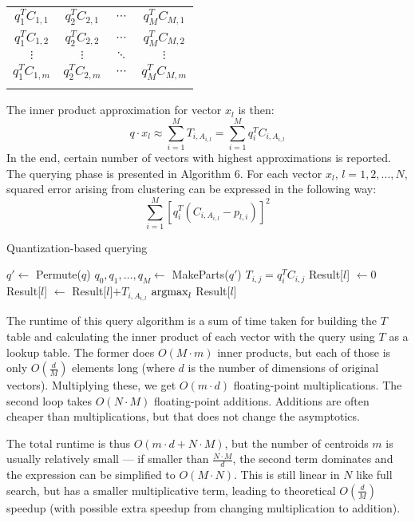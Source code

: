 \renewcommand{\arraystretch}{1.6}
\begin{center}
\begin{tabular}{|c|c|c|c|}
\hhline{----}
$ q_1^T C_{1,1} $ & $ q_2^T C_{2,1} $ & $ \cdots $ & $ q_M^T C_{M,1} $\\
\hhline{----}
$ q_1^T C_{1,2} $ & $ q_2^T C_{2,2} $ & $ \cdots $ & $ q_M^T C_{M,2} $\\
\hhline{----}
$ \vdots $ & $ \vdots $ & $ \ddots $ & $ \vdots $\\
\hhline{----}
$ q_1^T C_{1,m} $ & $ q_2^T C_{2,m} $ & $ \cdots $ & $ q_M^T C_{M,m} $\\
\hhline{----}
\end{tabular}
\end{center}

The inner product approximation for vector $x_l$ is then:
$$q \cdot x_l \approx \sum_{i=1}^{M} T_{i,A_{i,l}} = \sum_{i=1}^{M} q_i^T C_{i,A_{i,l}} $$
In the end, certain number of vectors with highest approximations is reported.
The querying phase is presented in Algorithm 6.
For each vector $x_l$, $l = 1,2,...,N$, squared error arising from clustering can be expressed in the following way:
$$ \sum_{i=1}^{M}  [q_{i}^{T} (C_{i, A_{i,l}} - p_{l,i})]^2$$

\begin{algorithm}
	\caption{Quantization-based querying}
	\begin{algorithmic}
		\State $q' \gets$ Permute($q$)
		\State $q_0, q_1, \dots, q_M \gets$ MakeParts($q'$)
				\State $T_{i,j} = q_i^T C_{i,j}$
			\EndFor
		\EndFor
			\State Result[$l$] $\gets 0$
				\State Result[$l$] $\gets$ Result[$l$]$+ T_{i,A_{i,l}}$
			\EndFor
		\EndFor
		\State \Return $\operatorname*{argmax}_{l}$ Result[$l$]
	\end{algorithmic}
\end{algorithm}

The runtime of this query algorithm is a sum of time taken for building the $T$ table and calculating the inner product of each vector with the query using $T$ as a lookup table.
The former does $O(M \cdot m)$ inner products, but each of those is only $O(\frac{d}{M})$
elements long (where $d$ is the number of dimensions of original vectors). 
Multiplying these, we get $O(m \cdot d)$ floating-point multiplications.
The second loop takes $O(N \cdot M)$ floating-point {additions}. Additions are often
cheaper than multiplications, but that does not change the asymptotics.

The total runtime is thus $O(m \cdot d + N \cdot M)$, but the number of centroids $m$ is usually 
relatively small --- if smaller than $\frac{N \cdot M}{d}$, the second term dominates 
and the expression can be simplified to
$O(M \cdot N)$. This is still linear in $N$ like full search, but has a smaller multiplicative
term, leading to theoretical $O(\frac{d}{M})$ speedup (with possible extra speedup from changing
multiplication to addition).

